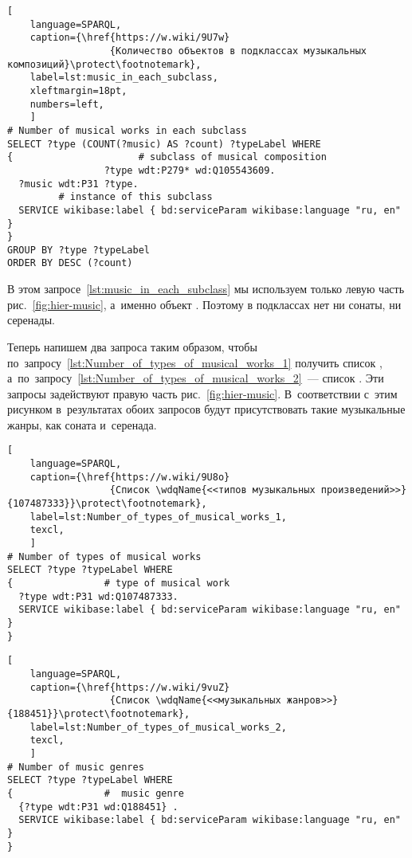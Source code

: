 \begin{lstlisting}[ 
    language=SPARQL,
    caption={\href{https://w.wiki/9U7w}
                  {Количество объектов в подклассах музыкальных композиций}\protect\footnotemark},
    label=lst:music_in_each_subclass,
    xleftmargin=18pt,
    numbers=left,
    ]
# Number of musical works in each subclass
SELECT ?type (COUNT(?music) AS ?count) ?typeLabel WHERE 
{                      # subclass of musical composition
                 ?type wdt:P279* wd:Q105543609.      
  ?music wdt:P31 ?type.
         # instance of this subclass
  SERVICE wikibase:label { bd:serviceParam wikibase:language "ru, en" }
}
GROUP BY ?type ?typeLabel
ORDER BY DESC (?count)
\end{lstlisting}%


В этом запросе~\ref{lst:music_in_each_subclass} 
мы используем только левую часть рис.~\ref{fig:hier-music}, 
а~именно объект . 
Поэтому в подклассах нет ни сонаты, ни серенады.

Теперь напишем два запроса таким образом, 
чтобы по~запросу~\ref{lst:Number_of_types_of_musical_works_1} получить 
список , 
а~по~запросу~\ref{lst:Number_of_types_of_musical_works_2}~--- 
список . 
Эти запросы задействуют правую часть рис.~\ref{fig:hier-music}. 
В~соответствии с~этим рисунком в~результатах обоих запросов будут присутствовать такие 
музыкальные жанры, как соната и~серенада.

\begin{lstlisting}[ 
    language=SPARQL,
    caption={\href{https://w.wiki/9U8o}
                  {Список \wdqName{<<типов музыкальных произведений>>}{107487333}}\protect\footnotemark},
    label=lst:Number_of_types_of_musical_works_1,
    texcl,
    ]
# Number of types of musical works
SELECT ?type ?typeLabel WHERE 
{                # type of musical work
  ?type wdt:P31 wd:Q107487333.      
  SERVICE wikibase:label { bd:serviceParam wikibase:language "ru, en" }
}
\end{lstlisting}%

\begin{lstlisting}[ 
    language=SPARQL,
    caption={\href{https://w.wiki/9vuZ}
                  {Список \wdqName{<<музыкальных жанров>>}{188451}}\protect\footnotemark},
    label=lst:Number_of_types_of_musical_works_2,
    texcl,
    ]
# Number of music genres
SELECT ?type ?typeLabel WHERE 
{                #  music genre
  {?type wdt:P31 wd:Q188451} .
  SERVICE wikibase:label { bd:serviceParam wikibase:language "ru, en" }
}
\end{lstlisting}%

